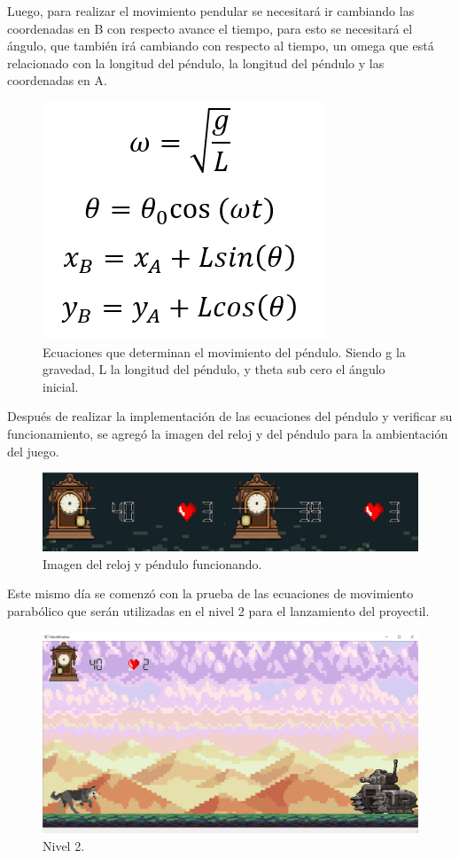 \documentclass{article}
\begin{document}
Luego, para realizar el movimiento pendular se necesitará ir cambiando las coordenadas en B con respecto avance el tiempo, para esto se necesitará el ángulo, que también irá cambiando con respecto al tiempo, un omega que está relacionado con la longitud del péndulo, la longitud del péndulo y las coordenadas en A.

\begin{figure}[h]
\includegraphics[scale=0.6]{Images/ecuacion2.png}
\centering
\caption{Ecuaciones que determinan el movimiento del péndulo. Siendo g la gravedad, L la longitud del péndulo, y theta sub cero el ángulo inicial.}
\label{fig:ecu1}
\end{figure}

Después de realizar la implementación de las ecuaciones del péndulo y verificar su funcionamiento, se agregó la imagen del reloj y del péndulo para la ambientación del juego.

\begin{figure}[h]
\includegraphics[scale=0.7]{Images/barra.png}
\centering
\caption{Imagen del reloj y péndulo funcionando.}
\label{fig:penduloreloj}
\end{figure}

Este mismo día se comenzó con la prueba de las ecuaciones de movimiento parabólico que serán utilizadas en el nivel 2 para el lanzamiento del proyectil.

\newpage
\begin{figure}[h]
\includegraphics[scale=0.4]{Images/Nivel 2.png}
\centering
\caption{Nivel 2.}
\label{fig:nivel2}
\end{figure}
\end{document}
